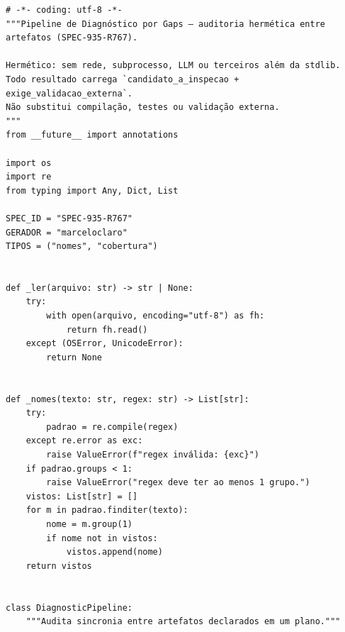 \documentclass[12pt,openany,oneside,a4paper,brazil,chapter=TITLE]{abntex2}
\begin{document}
\begin{lstlisting}
# -*- coding: utf-8 -*-
"""Pipeline de Diagnóstico por Gaps — auditoria hermética entre artefatos (SPEC-935-R767).

Hermético: sem rede, subprocesso, LLM ou terceiros além da stdlib.
Todo resultado carrega `candidato_a_inspecao + exige_validacao_externa`.
Não substitui compilação, testes ou validação externa.
"""
from __future__ import annotations

import os
import re
from typing import Any, Dict, List

SPEC_ID = "SPEC-935-R767"
GERADOR = "marceloclaro"
TIPOS = ("nomes", "cobertura")


def _ler(arquivo: str) -> str | None:
    try:
        with open(arquivo, encoding="utf-8") as fh:
            return fh.read()
    except (OSError, UnicodeError):
        return None


def _nomes(texto: str, regex: str) -> List[str]:
    try:
        padrao = re.compile(regex)
    except re.error as exc:
        raise ValueError(f"regex inválida: {exc}")
    if padrao.groups < 1:
        raise ValueError("regex deve ter ao menos 1 grupo.")
    vistos: List[str] = []
    for m in padrao.finditer(texto):
        nome = m.group(1)
        if nome not in vistos:
            vistos.append(nome)
    return vistos


class DiagnosticPipeline:
    """Audita sincronia entre artefatos declarados em um plano."""


\end{lstlisting}
\end{document}
